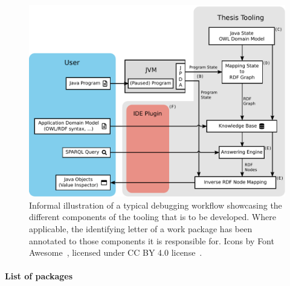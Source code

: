 \documentclass[
	english,
	accentcolor=9c,%
  marginpar=0cm %
	]{tudapub}
\begin{document}
\begin{figure}[H]
  \centering
  \includegraphics[width=0.8\linewidth]{gfx/workflow.pdf}
  \caption{%
    Informal illustration of a typical debugging workflow showcasing the
    different components of the tooling that is to be developed.
    Where applicable, the identifying letter of a work package has been
    annotated to those components it is responsible for.
    Icons by Font Awesome~\cite{fontawesome}, licensed under CC BY 4.0
    license~\cite{falicense}.
  }%
  \label{fig:workflow}
\end{figure}

\paragraph{List of packages}
\end{document}
